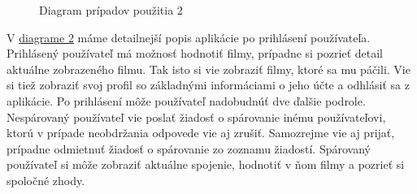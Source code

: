 \begin{figure}[hbt!]
  \centering  
  \def\stackalignment{c}
           {\scriptsize}
	\caption{Diagram prípadov použitia 2}  
  \label{usecase2}
\end{figure}
V \hyperref[usecase2]{diagrame 2} máme detailnejší popis aplikácie po prihlásení používateľa. Prihlásený používateľ má možnosť hodnotiť filmy, prípadne si pozrieť detail aktuálne zobrazeného filmu. Tak isto si vie zobraziť filmy, ktoré sa mu páčili. Vie si tiež zobraziť svoj profil so základnými informáciami o jeho účte a odhlásiť sa z aplikácie. 
Po prihlásení môže používateľ nadobudnúť dve ďalšie podrole. Nespárovaný používateľ vie poslať žiadosť o spárovanie inému používateľovi, ktorú v prípade neobdržania odpovede vie aj zrušiť. Samozrejme vie aj prijať, prípadne odmietnuť žiadosť o spárovanie zo zoznamu žiadostí. 
Spárovaný používateľ si môže zobraziť aktuálne spojenie, hodnotiť v ňom filmy a pozrieť si spoločné zhody. 

